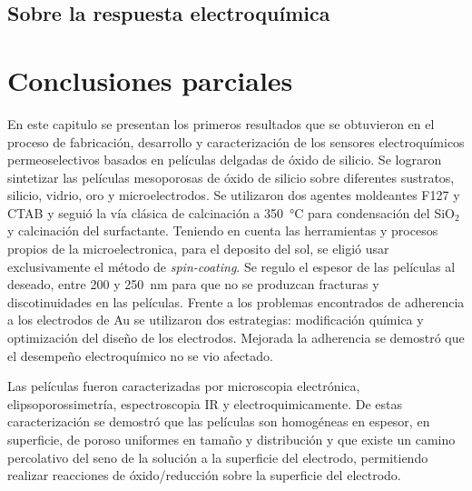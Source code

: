 	\subsection{Sobre la respuesta electroquímica}

\section{Conclusiones parciales}

	En este capitulo se presentan los primeros resultados que se obtuvieron en el proceso de fabricación, desarrollo y caracterización de los sensores electroquímicos permeoselectivos basados en películas delgadas de óxido de silicio. Se lograron sintetizar las películas mesoporosas de óxido de silicio sobre diferentes sustratos, silicio, vidrio, oro y microelectrodos. Se utilizaron dos agentes moldeantes F127 y CTAB y seguió la vía clásica de calcinación a \SI{350}{\celsius} para condensación del SiO$_2$ y calcinación del surfactante. Teniendo en cuenta las herramientas y procesos propios de la microelectronica, para el deposito del sol, se eligió usar exclusivamente el método de \textit{spin-coating}. Se regulo el espesor de las películas al deseado, entre 200 y \SI{250}{\nm} para que no se produzcan fracturas y discotinuidades en las películas. Frente a los problemas encontrados de adherencia a los electrodos de Au se utilizaron dos estrategias: modificación química y optimización del diseño de los electrodos. Mejorada la adherencia se demostró que el desempeño electroquímico no se vio afectado. 

	Las películas fueron caracterizadas por microscopia electrónica, elipsoporossimetría, espectroscopia IR y electroquimicamente. De estas caracterización se demostró que las películas son homogéneas en espesor, en superficie, de poroso uniformes en tamaño y distribución y que existe un camino percolativo del seno de la solución a la superficie del electrodo, permitiendo realizar reacciones de óxido/reducción sobre la superficie del electrodo.

